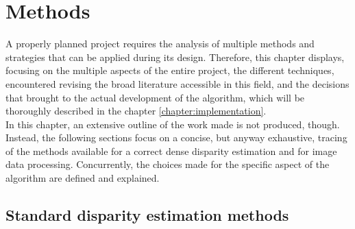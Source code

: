 \chapter{Methods}
\label{chapter:methods}

A properly planned project requires the analysis of multiple methods and strategies that can be applied during its design. 
Therefore, this chapter displays, focusing on the multiple aspects of the entire project, the different techniques, encountered revising the broad literature accessible in this field, and the decisions that brought to the actual development of the algorithm, which will be thoroughly described in the chapter \ref{chapter:implementation}.\\
In this chapter, an extensive outline of the work made is not produced, though. 
Instead, the following sections focus on a concise, but anyway exhaustive, tracing of the methods available for a correct dense disparity estimation and for image data processing.
Concurrently, the choices made for the specific aspect of the algorithm are defined and explained.

\section{Standard disparity estimation methods}
\label{section:std-methods}

